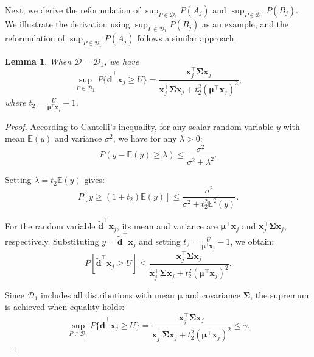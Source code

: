 \documentclass[preprint,12pt,authoryear]{elsarticle}
\newtheorem{lemma}{Lemma}
\begin{document}
Next, we derive the reformulation of $\sup_{P \in \mathcal{D}_1} P(A_j)$ and $\sup_{P \in \mathcal{D}_1} P(B_j)$. We illustrate the derivation using $\sup_{P \in \mathcal{D}_1} P(B_j)$ as an example, and the reformulation of $\sup_{P \in \mathcal{D}_1} P(A_j)$ follows a similar approach. 

\begin{lemma}\label{lem:sup_P_Bj}
    When $\mathcal{D} = \mathcal{D}_1$, we have
    \begin{equation}
    \sup_{P \in \mathcal{D}_1} P\{\widetilde{\mathbf{d}}^\top \mathbf{x}_j \geqslant U\} = \frac{\mathbf{x}_j^\top \boldsymbol{\Sigma} \mathbf{x}_j}{\mathbf{x}_j^\top \boldsymbol{\Sigma} \mathbf{x}_j + t_2^2 (\boldsymbol{\mu}^\top \mathbf{x}_j)^2},
    \end{equation}
    where $t_2 = \frac{U}{\boldsymbol{\mu}^\top \mathbf{x}_j} - 1$.
\end{lemma}
    
\begin{proof}

According to Cantelli's inequality, for any scalar random variable $y$ with mean $\mathbb{E}(y)$ and variance $\sigma^2$, we have for any $\lambda > 0$:
\begin{equation}
P(y - \mathbb{E}(y) \geqslant \lambda) \leqslant \frac{\sigma^2}{\sigma^2 + \lambda^2}. \label{eq:cantelli}
\end{equation}

Setting $\lambda = t_2 \mathbb{E}(y)$ gives:
\begin{equation}
P[y \geqslant (1 + t_2)\mathbb{E}(y)] \leqslant \frac{\sigma^2}{\sigma^2 + t_2^2 \mathbb{E}^2(y)}. \label{eq:cantelli_t}
\end{equation}

For the random variable $\widetilde{\mathbf{d}}^\top \mathbf{x}_j$, its mean and variance are $\boldsymbol{\mu}^\top \mathbf{x}_j$ and $\mathbf{x}_j^\top \boldsymbol{\Sigma} \mathbf{x}_j$, respectively. Substituting $y = \widetilde{\mathbf{d}}^\top \mathbf{x}_j$ and setting $t_2 = \frac{U}{\boldsymbol{\mu}^\top \mathbf{x}_j} - 1$, we obtain:
\begin{equation}
P[\widetilde{\mathbf{d}}^\top \mathbf{x}_j \geqslant U] \leqslant \frac{\mathbf{x}_j^\top \boldsymbol{\Sigma} \mathbf{x}_j}{\mathbf{x}_j^\top \boldsymbol{\Sigma} \mathbf{x}_j + t_2^2 (\boldsymbol{\mu}^\top \mathbf{x}_j)^2}. \label{eq:dricc_prob}
\end{equation}

Since $\mathcal{D}_1$ includes all distributions with mean $\boldsymbol{\mu}$ and covariance $\boldsymbol{\Sigma}$, the supremum is achieved when equality holds:
\begin{equation}
\sup_{P \in \mathcal{D}_1} P\{\widetilde{\mathbf{d}}^\top \mathbf{x}_j \geqslant U\} = \frac{\mathbf{x}_j^\top \boldsymbol{\Sigma} \mathbf{x}_j}{\mathbf{x}_j^\top \boldsymbol{\Sigma} \mathbf{x}_j + t_2^2 (\boldsymbol{\mu}^\top \mathbf{x}_j)^2} \leqslant \gamma. \label{eq:dricc_sup_equality}
\end{equation}
\end{proof}
\end{document}
